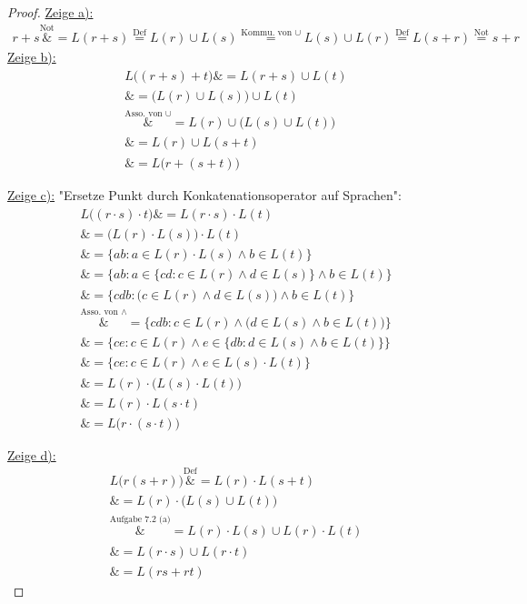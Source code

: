 \begin{proof}
	\underline{Zeige a):}
	\begin{align*}
		r+s
		\overset{\text{Not}}&=		
		L(r+s)
		\overset{\text{Def}}=
		L(r)\cup L(s)
		\overset{\text{Kommu. von }\cup}=
		L(s)\cup L(r)
		\overset{\text{Def}}=
		L(s+r)
		\overset{\text{Not}}=	
		s+r
	\end{align*}
	\underline{Zeige b):}
	\begin{align*}
		L\big((r+s)+t\big)
		\overset{\text{}}&=
		L(r+s)\cup L(t)\\
		\overset{\text{}}&=
		\big(L(r)\cup L(s)\big)\cup L(t)\\
		\overset{\text{Asso. von }\cup}&=
		L(r)\cup\big(L(s)\cup L(t)\big)\\
		\overset{\text{}}&=
		L(r)\cup L(s+t)\\
		\overset{\text{}}&=
		L\big(r+(s+t)\big)
	\end{align*}
	
	\underline{Zeige c):} "Ersetze Punkt durch Konkatenationsoperator auf Sprachen":
	\begin{align*}
		L\big((r\cdot s)\cdot t\big)
		\overset{\text{}}&=
		L(r\cdot s)\cdot L(t)\\
		\overset{\text{}}&=
		\big(L(r)\cdot L(s)\big)\cdot L(t)\\
		\overset{\text{}}&=
		\big\lbrace ab:a\in L(r)\cdot L(s)\wedge b\in L(t)\big\rbrace\\
		\overset{\text{}}&=
		\Big\lbrace ab:a\in\big\lbrace cd:c\in L(r)\wedge d\in L(s)\big\rbrace\wedge b\in L(t)\Big\rbrace\\
		\overset{\text{}}&=
		\Big\lbrace cdb:\big(c\in L(r)\wedge d\in L(s)\big)\wedge b\in L(t)\Big\rbrace\\
		\overset{\text{Asso. von }\wedge}&=
		\Big\lbrace cdb:c\in L(r)\wedge\big(d\in L(s)\wedge b\in L(t)\big)\Big\rbrace\\
		\overset{\text{}}&=
		\Big\lbrace ce:c\in L(r)\wedge e\in\big\lbrace db:d\in L(s)\wedge b\in L(t)\big\rbrace\Big\rbrace\\
		\overset{\text{}}&=
		\big\lbrace ce:c\in L(r)\wedge e\in L(s)\cdot L(t)\big\rbrace\\
		\overset{\text{}}&=
		L(r)\cdot\big(L(s)\cdot L(t)\big)\\
		\overset{\text{}}&=
		L(r)\cdot L(s\cdot t)\\
		\overset{\text{}}&=
		L\big(r\cdot(s\cdot t)\big)
	\end{align*}
	
	\underline{Zeige d):}
	\begin{align*}
		L\big(r(s+r)\big)
		\overset{\text{Def}}&=
		L(r)\cdot L(s+t)\\
		\overset{\text{}}&=
		L(r)\cdot\big(L(s)\cup L(t)\big)\\
		\overset{\text{Aufgabe 7.2 (a)}}&=
		L(r)\cdot L(s)\cup L(r)\cdot L(t)\\
		\overset{\text{}}&=
		L(r\cdot s)\cup L(r\cdot t)\\
		\overset{\text{}}&=
		L(rs+rt)
	\end{align*}		
	

\end{proof}
